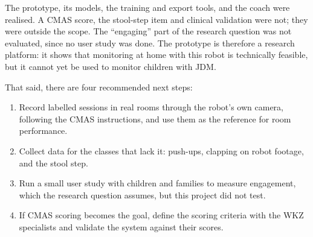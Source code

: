 The prototype, its models, the training and export tools, and the coach
were realised. A CMAS score, the stool-step item and clinical validation
were not; they were outside the scope. The ``engaging'' part of the
research question was not evaluated, since no user study was done. The
prototype is therefore a research platform: it shows that
monitoring at home with this robot is technically feasible, but it
cannot yet be used to monitor children with JDM. \newline

That said, there are four recommended next steps:
\begin{enumerate}
    \item Record labelled sessions in real rooms through the robot's own
    camera, following the CMAS instructions, and use them as the reference
    for room performance.
    \item Collect data for the classes that lack it: push-ups, clapping
    on robot footage, and the stool step.
    \item Run a small user study with children and families to measure
    engagement, which the research question assumes, but this project did
    not test.
    \item If CMAS scoring becomes the goal, define the scoring criteria
    with the WKZ specialists and validate the system against their scores.
\end{enumerate}